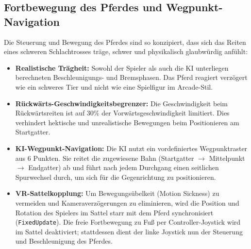 \documentclass[11pt, a4paper]{article}
\begin{document}
\subsection{Fortbewegung des Pferdes und Wegpunkt-Navigation}
Die Steuerung und Bewegung des Pferdes sind so konzipiert, dass sich das Reiten eines schweren Schlachtrosses träge, schwer und physikalisch glaubwürdig anfühlt:
\begin{itemize}
    \item \textbf{Realistische Trägheit:} Sowohl der Spieler als auch die KI unterliegen berechneten Beschleunigungs- und Bremsphasen. Das Pferd reagiert verzögert wie ein schweres Tier und nicht wie eine Spielfigur im Arcade-Stil.
    \item \textbf{Rückwärts-Geschwindigkeitsbegrenzer:} Die Geschwindigkeit beim Rückwärtsreiten ist auf $30\%$ der Vorwärtsgeschwindigkeit limitiert. Dies verhindert hektische und unrealistische Bewegungen beim Positionieren am Startgatter.
    \item \textbf{KI-Wegpunkt-Navigation:} Die KI nutzt ein vordefiniertes Wegpunktraster aus 6 Punkten. Sie reitet die zugewiesene Bahn (Startgatter $\rightarrow$ Mittelpunkt $\rightarrow$ Endgatter) ab und führt nach jedem Durchgang einen seitlichen Spurwechsel durch, um sich für die Gegenrichtung zu positionieren.
    \item \textbf{VR-Sattelkopplung:} Um Bewegungsübelkeit (Motion Sickness) zu vermeiden und Kameraverzögerungen zu eliminieren, wird die Position und Rotation des Spielers im Sattel starr mit dem Pferd synchronisiert (\texttt{FixedUpdate}). Die freie Fortbewegung zu Fuß per Controller-Joystick wird im Sattel deaktiviert; stattdessen dient der linke Joystick nun der Steuerung und Beschleunigung des Pferdes.
\end{itemize}
\end{document}
